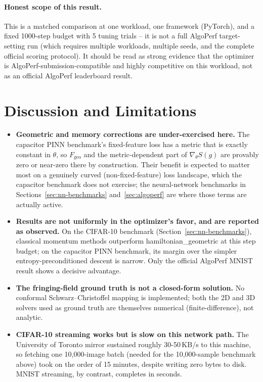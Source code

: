 \documentclass[11pt]{article}
\begin{document}
\paragraph{Honest scope of this result.} This is a matched comparison at one workload,
one framework (PyTorch), and a fixed 1000-step budget with 5 tuning trials -- it is not a
full AlgoPerf target-setting run (which requires multiple workloads, multiple seeds, and
the complete official scoring protocol). It should be read as strong evidence that the
optimizer is AlgoPerf-submission-compatible and highly competitive on this workload, not
as an official AlgoPerf leaderboard result.

\section{Discussion and Limitations}

\begin{itemize}
\item \textbf{Geometric and memory corrections are under-exercised here.} The capacitor
PINN benchmark's fixed-feature loss has a metric that is exactly constant in $\theta$, so
$F_{\mathrm{geo}}$ and the metric-dependent part of $\nabla_\theta S(g)$ are provably
zero or near-zero there by construction. Their benefit is expected to matter most on a
genuinely curved (non-fixed-feature) loss landscape, which the capacitor benchmark does
not exercise; the neural-network benchmarks in Sections~\ref{sec:nn-benchmarks}
and~\ref{sec:algoperf} are where those terms are actually active.
\item \textbf{Results are not uniformly in the optimizer's favor, and are reported as
observed.} On the CIFAR-10 benchmark (Section~\ref{sec:nn-benchmarks}), classical momentum
methods outperform hamiltonian\_geometric at this step budget; on the capacitor PINN
benchmark, its margin over the simpler entropy-preconditioned descent is narrow. Only the
official AlgoPerf MNIST result shows a decisive advantage.
\item \textbf{The fringing-field ground truth is not a closed-form solution.} No conformal
Schwarz--Christoffel mapping is implemented; both the 2D and 3D solvers used as ground
truth are themselves numerical (finite-difference), not analytic.
\item \textbf{CIFAR-10 streaming works but is slow on this network path.} The University of
Toronto mirror sustained roughly 30-50\,KB/s to this machine, so fetching one 10,000-image
batch (needed for the 10,000-sample benchmark above) took on the order of 15 minutes,
despite writing zero bytes to disk. MNIST streaming, by contrast, completes in seconds.
\end{itemize}
\end{document}
